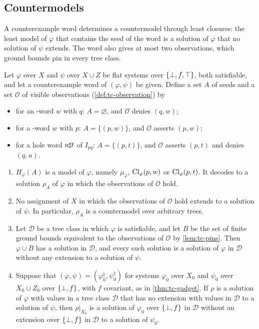 \subsection{Countermodels}\label{sec:as-countermodels}

A counterexample word determines a countermodel through least closures: the
least model of $\varphi$ that contains the seed of the word is a solution of
$\varphi$ that no solution of $\psi$ extends. The word also gives at most two
observations, which ground bounds pin in every tree class.

\begin{lemma}[Countermodels]\label{lem:as-countermodel}
Let $\varphi$ over $X$ and $\psi$ over $X\cup Z$ be flat systems over $\{\bot,f,\top\}$,
both satisfiable, and let a counterexample word of $(\varphi,\psi)$ be given.
Define a set $A$ of seeds and a set $\mathcal O$ of visible observations
(\cref{def:tc-observation}) by
\begin{itemize}[leftmargin=*]
\item for an \CondI-word $w$ with $q$: $A=\varnothing$, and $\mathcal O$ denies
  $(q,w)$;
\item for a \CondU-word $w$ with $p$: $A=\{(p,w)\}$, and $\mathcal O$ asserts
  $(p,w)$;
\item for a hole word $u\sharp t$ of $I_{pq}$: $A=\{(p,t)\}$, and $\mathcal O$
  asserts $(p,t)$ and denies $(q,u)$.
\end{itemize}
\begin{enumerate}[leftmargin=*]
\item $H_\varphi(A)$ is a model of $\varphi$, namely $\mu_\varphi$,
  $\operatorname{Cl}_\varphi(p,w)$ or $\operatorname{Cl}_\varphi(p,t)$. It decodes to a solution
  $\rho_A$ of $\varphi$ in which the observations of $\mathcal O$ hold.
\item No assignment of $X$ in which the observations of $\mathcal O$ hold
  extends to a solution of $\psi$. In particular, $\rho_A$ is a countermodel
  over arbitrary trees.
\item Let $\mathcal D$ be a tree class in which $\varphi$ is satisfiable, and
  let $B$ be the set of finite ground bounds equivalent to the observations of
  $\mathcal O$ by \cref{lem:tc-pins}. Then $\varphi\cup B$ has a solution in
  $\mathcal D$, and every such solution is a solution of $\varphi$ in
  $\mathcal D$ without any extension to a solution of $\psi$.
\item Suppose that $(\varphi,\psi)=(\varphi_0^\natural,\psi_0^\natural)$ for
  systems $\varphi_0$ over $X_0$ and $\psi_0$ over $X_0\cup Z_0$ over $\{\bot,f\}$,
  with $f$ covariant, as in \cref{thm:tc-gadget}. If $\rho$ is a solution of
  $\varphi$ with values in a tree class $\mathcal D$ that has no extension
  with values in $\mathcal D$ to a solution of $\psi$, then $\rho|_{X_0}$ is a
  solution of $\varphi_0$ over $\{\bot,f\}$ in $\mathcal D$ without an extension over
  $\{\bot,f\}$ in $\mathcal D$ to a solution of $\psi_0$.
\end{enumerate}
\end{lemma}

